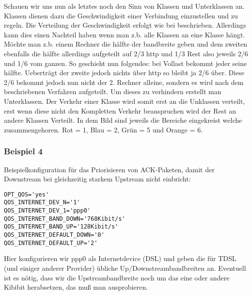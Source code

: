    Schauen wir uns nun als letztes noch den Sinn von Klassen und
   Unterklassen an. Klassen dienen dazu die Geschwindigkeit einer
   Verbindung einzustellen und zu regeln. Die Verteilung der
   Geschwindigkeit erfolgt wie bei 
   beschrieben. Allerdings kann dies einen Nachteil haben wenn man z.b.
   alle Klassen an eine Klasse hängt. Möchte man z.b. einem Rechner die
   hälfte der bandbreite geben und dem zweiten ebenfalls die hälfte
   allerdings aufgeteilt auf 2/3 http und 1/3 Rest also jeweils 2/6 und
   1/6 vom ganzen. So geschieht nun folgendes: bei Vollast bekommt jeder
   seine hälfte. Ueberträgt der zweite jedoch nichts über http so
   bleibt ja 2/6 über. Diese 2/6 bekommt jedoch nun nicht der 2. Rechner
   alleine, sondern es wird nach dem beschriebenen Verfahren aufgeteilt.
   Um dieses zu verhindern erstellt man Unterklassen. Der Verkehr einer
   Klasse wird somit erst an die Unklassen verteilt, erst wenn diese
   nicht den Kompletten Verkehr beanspruchen wird der Rest an andere
   Klassen Verteilt. In dem Bild sind jeweils die Bereiche eingekreist
   welche zusammengehoren. Rot = 1, Blau = 2, Grün = 5 und Orange = 6.



\subsubsection{Beispiel 4}


   Beispielkonfiguration für das Priorisieren von ACK-Paketen, damit der
   Downstream bei gleichzeitig starkem Upstream nicht einbricht:

\begin{small}
\begin{example}
\begin{verbatim}
OPT_QOS='yes'
QOS_INTERNET_DEV_N='1'
QOS_INTERNET_DEV_1='ppp0'
QOS_INTERNET_BAND_DOWN='768Kibit/s'
QOS_INTERNET_BAND_UP='128Kibit/s'
QOS_INTERNET_DEFAULT_DOWN='0'
QOS_INTERNET_DEFAULT_UP='2'

\end{verbatim}
\end{example}
\end{small}

   Hier konfigurieren wir ppp0 als Internetdevice (DSL) und geben die für
   TDSL (und einiger anderer Provider) übliche Up/Downstreambandbreiten
   an. Eventuell ist es nötig, dass wir die Upstreambandbreite noch um das
   eine oder andere Kibibit herabsetzen, das muß man ausprobieren.

